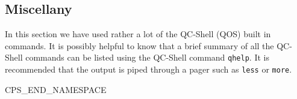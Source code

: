\subsection{Miscellany}
In this section we have used rather a lot of the QC-Shell (QOS) built
in commands. It is possibly helpful to know that a brief summary of all 
the QC-Shell commands can be listed using the QC-Shell command {\tt qhelp}.
It is recommended that the output is piped through a pager such as {\tt less}
or {\tt more}.

CPS_END_NAMESPACE
